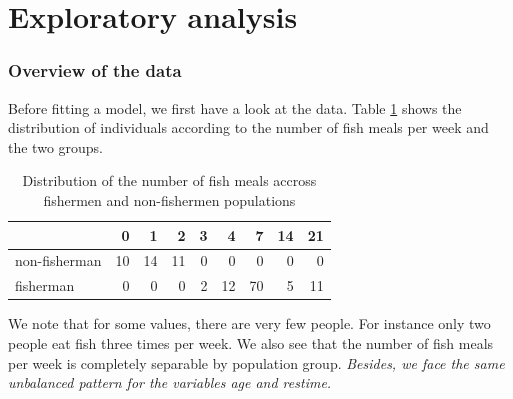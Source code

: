\documentclass[12pt,]{article}
\begin{document}
\section{Exploratory analysis}\label{exploratory-analysis}

\subsubsection{Overview of the data}\label{overview-of-the-data}

Before fitting a model, we first have a look at the data. Table
\ref{tbl:fishmlwk} shows the distribution of individuals according to
the number of fish meals per week and the two groups.

\begin{table}[t]

\caption{\label{tab:unnamed-chunk-6}\label{tbl:fishmlwk}Distribution of the number of fish meals accross fishermen and non-fishermen populations}
\centering
\begin{tabular}{lrrrrrrrr}
\toprule
  & 0 & 1 & 2 & 3 & 4 & 7 & 14 & 21\\
\midrule
\rowcolor{gray!6}  non-fisherman & 10 & 14 & 11 & 0 & 0 & 0 & 0 & 0\\
fisherman & 0 & 0 & 0 & 2 & 12 & 70 & 5 & 11\\
\bottomrule
\end{tabular}
\end{table}

We note that for some values, there are very few people. For instance
only two people eat fish three times per week. We also see that the
number of fish meals per week is completely separable by population
group.
\emph{Besides, we face the same unbalanced pattern for the variables age and restime.}
\end{document}
